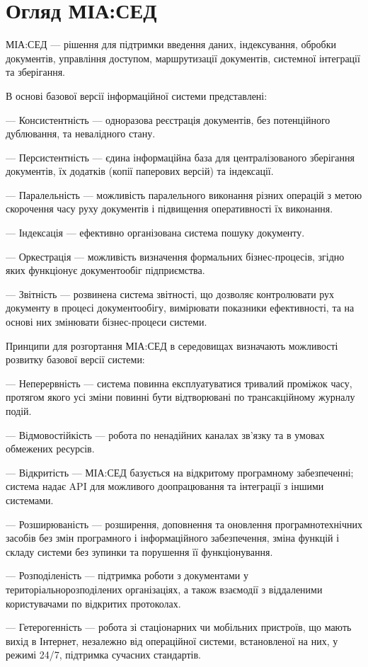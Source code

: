 \chapter{Огляд МІА:СЕД}

МІА:СЕД --- рішення для підтримки введення даних, індексування, обробки
документів, управління доступом, маршрутизації документів, системної
інтеграції та зберігання.

В основі базової версії інформаційної системи представлені:

--- Консистентність --- одноразова реєстрація документів, без потенційного
дублювання, та невалідного стану.

--- Персистентність --- єдина інформаційна база для централізованого зберігання
документів, їх додатків (копії паперових версій) та індексації.

--- Паралельність — можливість паралельного виконання різних операцій з
метою скорочення часу руху документів і підвищення оперативності їх
виконання.

--- Індексація --- ефективно організована система пошуку документу.

--- Оркестрація --- можливість визначення формальних бізнес-процесів, згідно
яких функціонує документообіг підприємства.

--- Звітність --- розвинена система звітності, що дозволяє контролювати рух
документу в процесі документообігу, вимірювати показники ефективності,
та на основі них змінювати бізнес-процеси системи.

Принципи для розгортання МІА:СЕД в середовищах визначають
можливості розвитку базової версії системи:

--- Неперервність --- система повинна експлуатуватися тривалий проміжок часу,
протягом якого усі зміни повинні бути відтворювані по трансакційному
журналу подій.

--- Відмовостійкість --- робота по ненадійних каналах зв’язку та в умовах
обмежених ресурсів.

--- Відкритість --- МІА:СЕД базується на відкритому програмному забезпеченні;
система надає API для можливого доопрацювання та інтеграції з іншими
системами.

--- Розширюваність --- розширення, доповнення та оновлення програмнотехнічних засобів без змін програмного і інформаційного забезпечення,
зміна функцій і складу системи без зупинки та порушення її
функціонування.

--- Розподіленість --- підтримка роботи з документами у територіальнорозподілених організаціях, а також взаємодії з віддаленими користувачами
по відкритих протоколах.

--- Гетерогенність --- робота зі стаціонарних чи мобільних пристроїв, що мають
вихід в Інтернет, незалежно від операційної системи, встановленої на них, у
режимі 24/7, підтримка сучасних стандартів.

